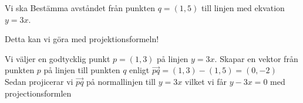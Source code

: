 \documentclass[../../main.tex]{subfiles}
\begin{document}
\begin{solution}{25} 

 Vi ska Bestämma avståndet från punkten $q=(1,5)$ till linjen med ekvation $y = 3x$.

Detta kan vi göra med projektionsformeln! 

Vi väljer en godtycklig punkt $p=(1,3)$ på linjen $y = 3x$. 
Skapar en vektor från punkten $p$ på linjen till punkten $q$ enligt $\Vec{pq}=(1,3)-(1,5)=(0,-2)$
Sedan projicerar vi $\Vec{pq}$ på normallinjen till $y = 3x$ vilket vi får $y - 3x=0$  med projectionsformlen 

\end{solution}
\end{document}
